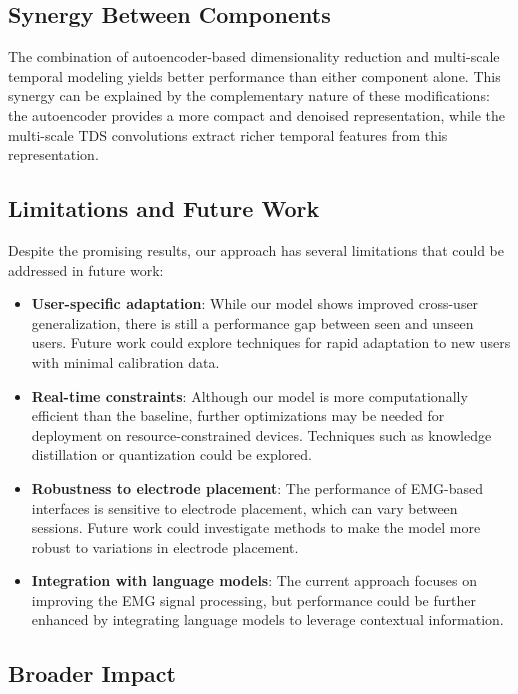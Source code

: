 \subsection{Synergy Between Components}

The combination of autoencoder-based dimensionality reduction and multi-scale temporal modeling yields better performance than either component alone. This synergy can be explained by the complementary nature of these modifications: the autoencoder provides a more compact and denoised representation, while the multi-scale TDS convolutions extract richer temporal features from this representation.

\subsection{Limitations and Future Work}

Despite the promising results, our approach has several limitations that could be addressed in future work:

\begin{itemize}
    \item \textbf{User-specific adaptation}: While our model shows improved cross-user generalization, there is still a performance gap between seen and unseen users. Future work could explore techniques for rapid adaptation to new users with minimal calibration data.
    
    \item \textbf{Real-time constraints}: Although our model is more computationally efficient than the baseline, further optimizations may be needed for deployment on resource-constrained devices. Techniques such as knowledge distillation or quantization could be explored.
    
    \item \textbf{Robustness to electrode placement}: The performance of EMG-based interfaces is sensitive to electrode placement, which can vary between sessions. Future work could investigate methods to make the model more robust to variations in electrode placement.
    
    \item \textbf{Integration with language models}: The current approach focuses on improving the EMG signal processing, but performance could be further enhanced by integrating language models to leverage contextual information.
\end{itemize}

\subsection{Broader Impact}

